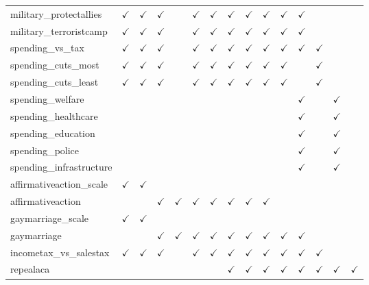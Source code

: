 \documentclass[12pt]{article}
\begin{document}
\begin{table}[H]
{\begin{tabular}{lcccccccccccccl}
military\_protectallies & $\checkmark$ & $\checkmark$ & $\checkmark$ &  & $\checkmark$ & $\checkmark$ & $\checkmark$ & $\checkmark$ & $\checkmark$ & $\checkmark$ & $\checkmark$ &  &  & \\
military\_terroristcamp & $\checkmark$ & $\checkmark$ & $\checkmark$ &  & $\checkmark$ & $\checkmark$ & $\checkmark$ & $\checkmark$ & $\checkmark$ & $\checkmark$ & $\checkmark$ &  &  & \\
spending\_vs\_tax & $\checkmark$ & $\checkmark$ & $\checkmark$ &  & $\checkmark$ & $\checkmark$ & $\checkmark$ & $\checkmark$ & $\checkmark$ & $\checkmark$ & $\checkmark$ & $\checkmark$ &  & \\
spending\_cuts\_most & $\checkmark$ & $\checkmark$ & $\checkmark$ &  & $\checkmark$ & $\checkmark$ & $\checkmark$ & $\checkmark$ & $\checkmark$ & $\checkmark$ &  & $\checkmark$ &  & \\
spending\_cuts\_least & $\checkmark$ & $\checkmark$ & $\checkmark$ &  & $\checkmark$ & $\checkmark$ & $\checkmark$ & $\checkmark$ & $\checkmark$ & $\checkmark$ &  & $\checkmark$ &  & \\
spending\_welfare &  &  &  &  &  &  &  &  &  &  & $\checkmark$ &  & $\checkmark$ & \\
spending\_healthcare &  &  &  &  &  &  &  &  &  &  & $\checkmark$ &  & $\checkmark$ & \\
spending\_education &  &  &  &  &  &  &  &  &  &  & $\checkmark$ &  & $\checkmark$ & \\
spending\_police &  &  &  &  &  &  &  &  &  &  & $\checkmark$ &  & $\checkmark$ & \\
spending\_infrastructure &  &  &  &  &  &  &  &  &  &  & $\checkmark$ &  & $\checkmark$ & \\
affirmativeaction\_scale & $\checkmark$ & $\checkmark$ &  &  &  &  &  &  &  &  &  &  &  & \\
affirmativeaction &  &  & $\checkmark$ & $\checkmark$ & $\checkmark$ & $\checkmark$ & $\checkmark$ & $\checkmark$ & $\checkmark$ &  &  &  &  & \\
gaymarriage\_scale & $\checkmark$ & $\checkmark$ &  &  &  &  &  &  &  &  &  &  &  & \\
gaymarriage &  &  & $\checkmark$ & $\checkmark$ & $\checkmark$ & $\checkmark$ & $\checkmark$ & $\checkmark$ & $\checkmark$ & $\checkmark$ & $\checkmark$ &  &  & \\
incometax\_vs\_salestax & $\checkmark$ & $\checkmark$ & $\checkmark$ &  & $\checkmark$ & $\checkmark$ & $\checkmark$ & $\checkmark$ & $\checkmark$ & $\checkmark$ & $\checkmark$ & $\checkmark$ &  & \\
repealaca &  &  &  &  &  &  & $\checkmark$ & $\checkmark$ & $\checkmark$ & $\checkmark$ & $\checkmark$ & $\checkmark$ & $\checkmark$ & $\checkmark$\\
\bottomrule
\end{tabular}}
\end{table}
\end{document}
